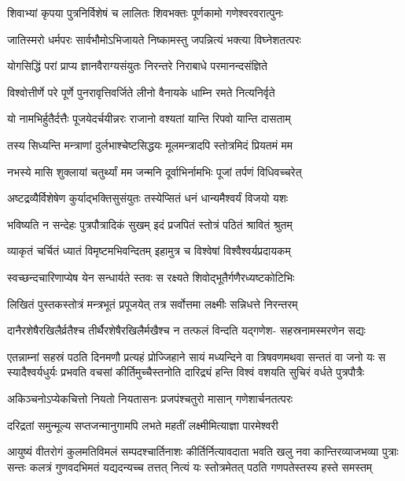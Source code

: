 \twolineshloka
{शिवाभ्यां कृपया पुत्रनिर्विशेषं च लालितः}
{शिवभक्तः पूर्णकामो गणेश्वरवरात्पुनः}

\twolineshloka
{जातिस्मरो धर्मपरः सार्वभौमोऽभिजायते}
{निष्कामस्तु जपन्नित्यं भक्त्या विघ्नेशतत्परः}

\twolineshloka
{योगसिद्धिं परां प्राप्य ज्ञानवैराग्यसंयुतः}
{निरन्तरे निराबाधे परमानन्दसंज्ञिते}

\twolineshloka
{विश्वोत्तीर्णे परे पूर्णे पुनरावृत्तिवर्जिते}
{लीनो वैनायके धाम्नि रमते नित्यनिर्वृते}

\twolineshloka
{यो नामभिर्हुतैर्दत्तैः पूजयेदर्चयीन्नरः}
{राजानो वश्यतां यान्ति रिपवो यान्ति दासताम्}

\twolineshloka
{तस्य सिध्यन्ति मन्त्राणां दुर्लभाश्चेष्टसिद्धयः}
{मूलमन्त्रादपि स्तोत्रमिदं प्रियतमं मम}

\twolineshloka
{नभस्ये मासि शुक्लायां चतुर्थ्यां मम जन्मनि}
{दूर्वाभिर्नामभिः पूजां तर्पणं विधिवच्चरेत्}

\twolineshloka
{अष्टद्रव्यैर्विशेषेण कुर्याद्भक्तिसुसंयुतः}
{तस्येप्सितं धनं धान्यमैश्वर्यं विजयो यशः}

\twolineshloka
{भविष्यति न सन्देहः पुत्रपौत्रादिकं सुखम्}
{इदं प्रजपितं स्तोत्रं पठितं श्रावितं श्रुतम्}

\twolineshloka
{व्याकृतं चर्चितं ध्यातं विमृष्टमभिवन्दितम्}
{इहामुत्र च विश्वेषां विश्वैश्वर्यप्रदायकम्}

\twolineshloka
{स्वच्छन्दचारिणाप्येष येन सन्धार्यते स्तवः}
{स रक्ष्यते शिवोद्भूतैर्गणैरध्यष्टकोटिभिः}

\twolineshloka
{लिखितं पुस्तकस्तोत्रं मन्त्रभूतं प्रपूजयेत्}
{तत्र सर्वोत्तमा लक्ष्मीः सन्निधत्ते निरन्तरम्}

\fourlineindentedshloka
{दानैरशेषैरखिलैर्व्रतैश्च}
{तीर्थैरशेषैरखिलैर्मखैश्च}
{न तत्फलं विन्दति यद्गणेश-}
{सहस्रनामस्मरणेन सद्यः}

\fourlineindentedshloka
{एतन्नाम्नां सहस्रं पठति दिनमणौ प्रत्यहं प्रोज्जिहाने}
{सायं मध्यन्दिने वा त्रिषवणमथवा सन्ततं वा जनो यः}
{स स्यादैश्वर्यधुर्यः प्रभवति वचसां कीर्तिमुच्चैस्तनोति}
{दारिद्र्यं हन्ति विश्वं वशयति सुचिरं वर्धते पुत्रपौत्रैः}

\twolineshloka
{अकिञ्चनोऽप्येकचित्तो नियतो नियतासनः}
{प्रजपंश्चतुरो मासान् गणेशार्चनतत्परः}

\twolineshloka
{दरिद्रतां समुन्मूल्य सप्तजन्मानुगामपि}
{लभते महतीं लक्ष्मीमित्याज्ञा पारमेश्वरी}

\fourlineindentedshloka
{आयुष्यं वीतरोगं कुलमतिविमलं सम्पदश्चार्तिनाशः}
{कीर्तिर्नित्यावदाता भवति खलु नवा कान्तिरव्याजभव्या}
{पुत्राः सन्तः कलत्रं गुणवदभिमतं यद्यदन्यच्च तत्तत्}
{नित्यं यः स्तोत्रमेतत् पठति गणपतेस्तस्य हस्ते समस्तम्}

